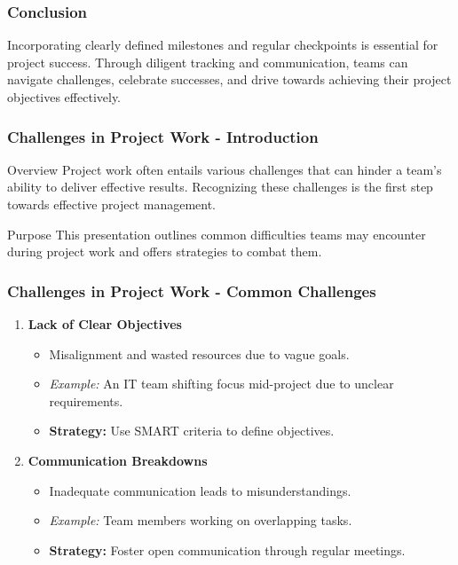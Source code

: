 \documentclass[aspectratio=169]{beamer}
\begin{document}
\begin{frame}[fragile]
    \frametitle{Conclusion}
    Incorporating clearly defined milestones and regular checkpoints is essential for project success. Through diligent tracking and communication, teams can navigate challenges, celebrate successes, and drive towards achieving their project objectives effectively.
\end{frame}

\begin{frame}[fragile]
    \frametitle{Challenges in Project Work - Introduction}
    \begin{block}{Overview}
        Project work often entails various challenges that can hinder a team's ability to deliver effective results. Recognizing these challenges is the first step towards effective project management.
    \end{block}
    \begin{block}{Purpose}
        This presentation outlines common difficulties teams may encounter during project work and offers strategies to combat them.
    \end{block}
\end{frame}

\begin{frame}[fragile]
    \frametitle{Challenges in Project Work - Common Challenges}
    \begin{enumerate}
        \item \textbf{Lack of Clear Objectives}
        \begin{itemize}
            \item Misalignment and wasted resources due to vague goals.
            \item \textit{Example:} An IT team shifting focus mid-project due to unclear requirements.
            \item \textbf{Strategy:} Use SMART criteria to define objectives.
        \end{itemize}
        
        \item \textbf{Communication Breakdowns}
        \begin{itemize}
            \item Inadequate communication leads to misunderstandings.
            \item \textit{Example:} Team members working on overlapping tasks.
            \item \textbf{Strategy:} Foster open communication through regular meetings.
        \end{itemize}
    \end{enumerate}
\end{frame}
\end{document}
